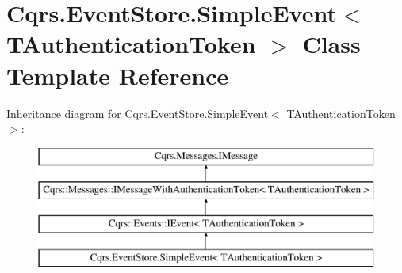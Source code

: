 \hypertarget{classCqrs_1_1EventStore_1_1SimpleEvent}{}\section{Cqrs.\+Event\+Store.\+Simple\+Event$<$ T\+Authentication\+Token $>$ Class Template Reference}
\label{classCqrs_1_1EventStore_1_1SimpleEvent}
Inheritance diagram for Cqrs.\+Event\+Store.\+Simple\+Event$<$ T\+Authentication\+Token $>$\+:\begin{figure}[H]
\begin{center}
\leavevmode
\includegraphics[height=4.000000cm]{classCqrs_1_1EventStore_1_1SimpleEvent}
\end{center}
\end{figure}
